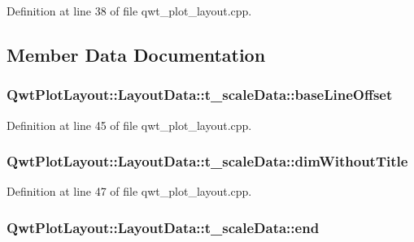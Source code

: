 Definition at line 38 of file qwt\-\_\-plot\-\_\-layout.\-cpp.



\subsection{Member Data Documentation}
\hypertarget{struct_qwt_plot_layout_1_1_layout_data_1_1t__scale_data_a6160b71adee73ddc3a7a39774ed70979}{
\subsubsection[{base\-Line\-Offset}]{ Qwt\-Plot\-Layout\-::\-Layout\-Data\-::t\-\_\-scale\-Data\-::base\-Line\-Offset}}\label{struct_qwt_plot_layout_1_1_layout_data_1_1t__scale_data_a6160b71adee73ddc3a7a39774ed70979}


Definition at line 45 of file qwt\-\_\-plot\-\_\-layout.\-cpp.

\hypertarget{struct_qwt_plot_layout_1_1_layout_data_1_1t__scale_data_a8e5474f10631c953333a08ffc8605fed}{
\subsubsection[{dim\-Without\-Title}]{ Qwt\-Plot\-Layout\-::\-Layout\-Data\-::t\-\_\-scale\-Data\-::dim\-Without\-Title}}\label{struct_qwt_plot_layout_1_1_layout_data_1_1t__scale_data_a8e5474f10631c953333a08ffc8605fed}


Definition at line 47 of file qwt\-\_\-plot\-\_\-layout.\-cpp.

\hypertarget{struct_qwt_plot_layout_1_1_layout_data_1_1t__scale_data_a2fdfe39b4a59e6f6688959e3f3161398}{
\subsubsection[{end}]{ Qwt\-Plot\-Layout\-::\-Layout\-Data\-::t\-\_\-scale\-Data\-::end}}\label{struct_qwt_plot_layout_1_1_layout_data_1_1t__scale_data_a2fdfe39b4a59e6f6688959e3f3161398}


